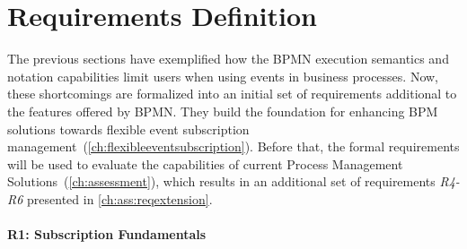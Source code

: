 \section{Requirements Definition}\label{ch:requirements}
The previous sections have exemplified how the BPMN execution semantics and notation capabilities limit users when using events in business processes. 
Now, these shortcomings are formalized into an initial set of requirements additional to the features offered by BPMN.
They build the foundation for enhancing BPM solutions towards flexible event subscription management~(\autoref{ch:flexibleeventsubscription}).
Before that, the formal requirements will be used to evaluate the capabilities of current Process Management Solutions~(\autoref{ch:assessment}), which results in an additional set of requirements \textit{R4-R6} presented in \autoref{ch:ass:reqextension}.





\paragraph{R1: Subscription Fundamentals}

